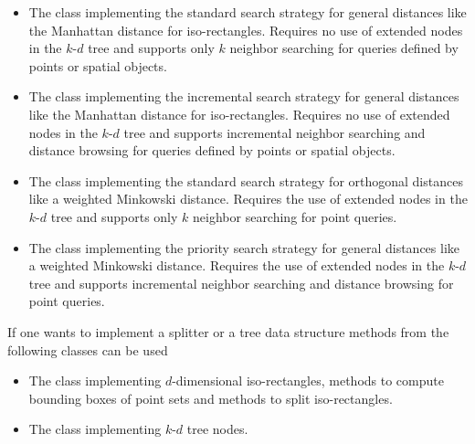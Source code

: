 \begin{itemize}

\item
The class  
implementing the standard search strategy for general distances
like the Manhattan distance for iso-rectangles.
Requires no use of extended nodes in the $k$-$d$ tree and supports only $k$
neighbor searching for queries defined by points or spatial objects.


\item
The class  implementing the incremental
search strategy for general distances like the Manhattan distance for
iso-rectangles.  Requires no use of extended nodes in the $k$-$d$ tree
and supports incremental neighbor searching and distance browsing for
queries defined by points or spatial objects.

\item
The class  
implementing the standard search strategy for orthogonal distances
like a weighted Minkowski distance. Requires the use of extended nodes in the $k$-$d$ tree and supports 
only $k$ neighbor searching for point queries.

\item
The class  
implementing the priority search strategy for general distances
like a weighted Minkowski distance. Requires the use of extended nodes in the $k$-$d$ tree and supports incremental
neighbor searching and distance browsing for point queries.

\end{itemize}

If one wants to implement a splitter or a tree data structure
methods from the following classes can be used

\begin{itemize}

\item
The class  implementing $d$-dimensional iso-rectangles, 
methods to compute bounding boxes
of point sets and methods to split iso-rectangles.

\item
The class  implementing $k$-$d$ tree nodes.

\end{itemize}

